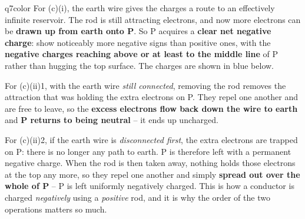 \documentclass[11pt,a4paper]{article}
\begin{document}
\begin{ansbox}{q7color}
For (c)(i), the earth wire gives the charges a route to an effectively infinite reservoir. The rod is still attracting electrons, and now more electrons can be \textbf{drawn up from earth onto P}. So P acquires a \textbf{clear net negative charge}: show noticeably more negative signs than positive ones, with the \textbf{negative charges reaching above or at least to the middle line} of P rather than hugging the top surface. The charges are shown in blue below.
\begin{center}
\end{center}

For (c)(ii)1, with the earth wire \emph{still connected}, removing the rod removes the attraction that was holding the extra electrons on P. They repel one another and are free to leave, so the \textbf{excess electrons flow back down the wire to earth} and \textbf{P returns to being neutral} -- it ends up uncharged.

For (c)(ii)2, if the earth wire is \emph{disconnected first}, the extra electrons are trapped on P: there is no longer any path to earth. P is therefore left with a permanent negative charge. When the rod is then taken away, nothing holds those electrons at the top any more, so they repel one another and simply \textbf{spread out over the whole of P} -- P is left uniformly negatively charged. This is how a conductor is charged \emph{negatively} using a \emph{positive} rod, and it is why the order of the two operations matters so much.
\end{ansbox}
\end{document}
